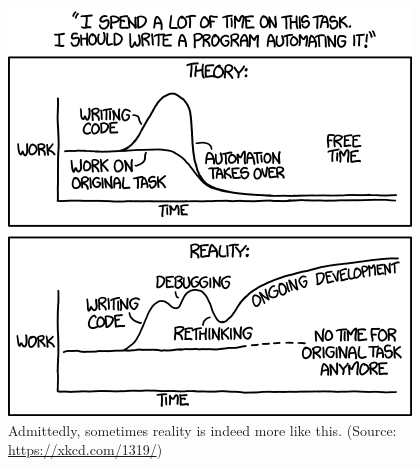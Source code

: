\documentclass[12pt,letterpaper]{article}
\begin{document}
\begin{figure}[!h]
	\centering
	\includegraphics[width=0.7\linewidth]{figs/automation.png}
	\caption{Admittedly, sometimes reality is indeed more like this. (Source: 
	\url{https://xkcd.com/1319/})}
	\label{fig:automation}
\end{figure}
\end{document}
